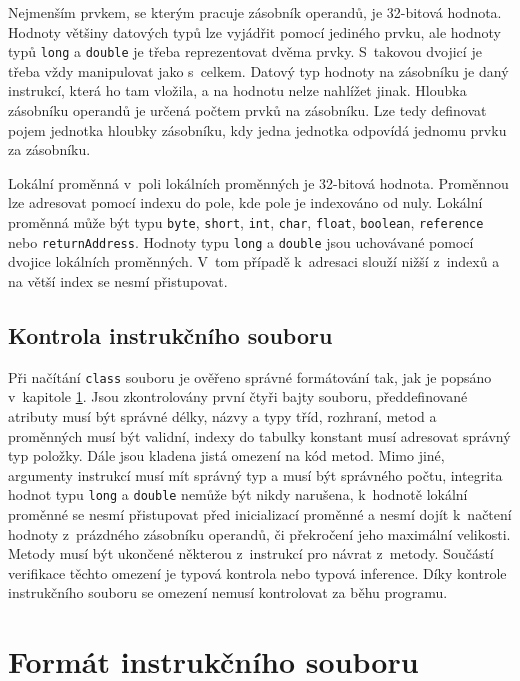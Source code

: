 Nejmenším prvkem, se kterým pracuje zásobník operandů, je 32-bitová hodnota. Hodnoty většiny datových typů lze vyjádřit pomocí jediného prvku, ale hodnoty typů \texttt{long} a \texttt{double} je třeba reprezentovat dvěma prvky. S~takovou dvojicí je třeba vždy manipulovat jako s~celkem. Datový typ hodnoty na zásobníku je daný instrukcí, která ho tam vložila, a na hodnotu nelze nahlížet jinak. Hloubka zásobníku operandů je určená počtem prvků na zásobníku. Lze tedy definovat pojem jednotka hloubky zásobníku, kdy jedna jednotka odpovídá jednomu prvku za zásobníku.

Lokální proměnná v~poli lokálních proměnných je 32-bitová hodnota. Proměnnou lze adresovat pomocí indexu do pole, kde pole je indexováno od nuly. Lokální proměnná může být typu \texttt{byte}, \texttt{short}, \texttt{int}, \texttt{char}, \texttt{float}, \texttt{boolean}, \texttt{reference} nebo \texttt{returnAddress}. Hodnoty typu \texttt{long} a \texttt{double} jsou uchovávané pomocí dvojice lokálních proměnných. V~tom případě k~adresaci slouží nižší z~indexů a na větší index se nesmí přistupovat. 


\subsection{Kontrola instrukčního souboru}

Při načítání \texttt{class} souboru je ověřeno správné formátování tak, jak je popsáno v~kapitole \ref{Bytecode:Format}. Jsou zkontrolovány první čtyři bajty souboru, předdefinované atributy musí být správné délky, názvy a typy tříd, rozhraní, metod a proměnných musí být validní, indexy do tabulky konstant musí adresovat správný typ položky. Dále jsou kladena jistá omezení na kód metod. Mimo jiné, argumenty instrukcí musí mít správný typ a musí být správného počtu, integrita hodnot typu \texttt{long} a \texttt{double} nemůže být nikdy narušena, k~hodnotě lokální proměnné se nesmí přistupovat před inicializací proměnné a nesmí dojít k~načtení hodnoty z~prázdného zásobníku operandů, či překročení jeho maximální velikosti. Metody musí být ukončené některou z~instrukcí pro návrat z~metody. Součástí verifikace těchto omezení je typová kontrola nebo typová inference. Díky kontrole instrukčního souboru se omezení nemusí kontrolovat za běhu programu.


\section{Formát instrukčního souboru}\label{Bytecode:Format}

